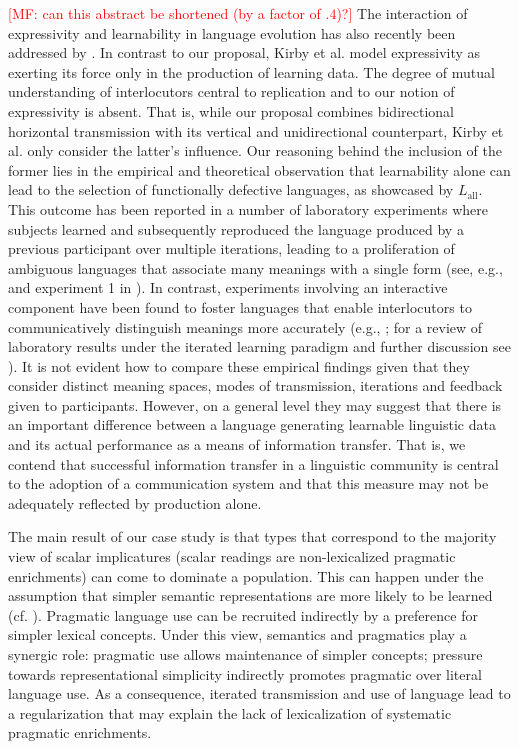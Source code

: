\documentclass[a4paper, 11pt]{article}
\theoremstyle{Satz}
\newcommand{\mf}[1]{\textcolor{Red}{[MF: #1]}}
\newcommand{\mylang}[1]{\ensuremath{L_{\text{#1}}}\xspace} %
\newcommand{\Lall}{\mylang{all}}
\begin{document}
\mf{can this abstract be shortened (by a factor of $.4$)?} The interaction of expressivity and
learnability in language evolution has also recently been addressed by
\citet{kirby+etal:2015}. In contrast to our proposal, Kirby et al. model expressivity as
exerting its force only in the production of learning data. The degree of mutual understanding
of interlocutors central to replication and to our notion of expressivity is absent. That is,
while our proposal combines bidirectional horizontal transmission with its vertical and
unidirectional counterpart, Kirby et al. only consider the latter's influence. Our reasoning
behind the inclusion of the former lies in the empirical and theoretical observation that
learnability alone can lead to the selection of functionally defective languages, as showcased
by $\Lall$. This outcome has been reported in a number of laboratory experiments where subjects
learned and subsequently reproduced the language produced by a previous participant over
multiple iterations, leading to a proliferation of ambiguous languages that associate many
meanings with a single form (see, e.g., \citealt{silvey+etal:2014} and experiment 1 in
\citealt{kirby+etal:2008}). In contrast, experiments involving an interactive component have
been found to foster languages that enable interlocutors to communicatively distinguish
meanings more accurately (e.g., \citealt{fay+etal:2013}; for a review of laboratory results
under the iterated learning paradigm and further discussion see \citealt{kirby+etal:2015,
  tamariz+kirby:2016}). It is not evident how to compare these empirical findings given that
they consider distinct meaning spaces, modes of transmission, iterations and feedback given to
participants. However, on a general level they may suggest that there is an important
difference between a language generating learnable linguistic data and its actual performance
as a means of information transfer. That is, we contend that successful information transfer in
a linguistic community is central to the adoption of a communication system and that this
measure may not be adequately reflected by production alone.

The main result of our case study is that types that correspond to the majority view of scalar
implicatures (scalar readings are non-lexicalized pragmatic enrichments) can come to dominate a
population. This can happen under the assumption that simpler semantic representations are more
likely to be learned (cf. \citealt{chater+vitanyi:2003}). Pragmatic language use can be
recruited indirectly by a preference for simpler lexical concepts. Under this view, semantics
and pragmatics play a synergic role: pragmatic use allows maintenance of simpler concepts;
pressure towards representational simplicity indirectly promotes pragmatic over literal
language use. As a consequence, iterated transmission and use of language lead to a
regularization that may explain the lack of lexicalization of systematic pragmatic enrichments.
\end{document}
